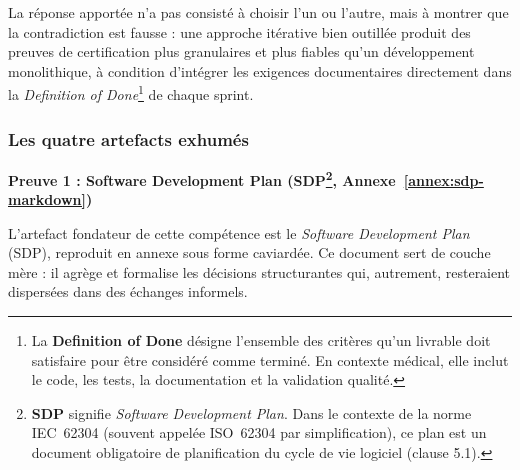 La réponse apportée n'a pas consisté à choisir l'un ou l'autre, mais à montrer que la contradiction est fausse : une approche itérative bien outillée produit des preuves de certification plus granulaires et plus fiables qu'un développement monolithique, à condition d'intégrer les exigences documentaires directement dans la \textit{Definition of Done}\footnote{La \textbf{Definition of Done} désigne l'ensemble des critères qu'un livrable doit satisfaire pour être considéré comme terminé. En contexte médical, elle inclut le code, les tests, la documentation et la validation qualité.} de chaque sprint.

\subsubsection*{Les quatre artefacts exhumés}

\medskip\noindent\textbf{Preuve 1 : Software Development Plan (SDP\footnote{\textbf{SDP} signifie \textit{Software Development Plan}. Dans le contexte de la norme IEC~62304 (souvent appelée ISO~62304 par simplification), ce plan est un document obligatoire de planification du cycle de vie logiciel (clause 5.1).}, Annexe~\ref{annex:sdp-markdown})}\par\smallskip

L'artefact fondateur de cette compétence est le \textit{Software Development Plan} (SDP), reproduit en annexe sous forme caviardée. Ce document sert de couche mère : il agrège et formalise les décisions structurantes qui, autrement, resteraient dispersées dans des échanges informels.

